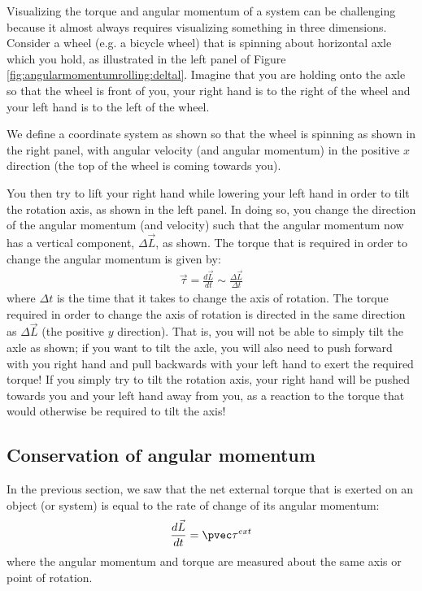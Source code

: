 Visualizing the torque and angular momentum of a system can be challenging because it almost always requires visualizing something in three dimensions. Consider a wheel (e.g. a bicycle wheel) that is spinning about horizontal axle which you hold, as illustrated in the left panel of Figure \ref{fig:angularmomentumrolling:deltal}. Imagine that you are holding onto the axle so that the wheel is front of you, your right hand is to the right of the wheel and your left hand is to the left of the wheel.

We define a coordinate system as shown so that the wheel is spinning as shown in the right panel, with angular velocity (and angular momentum) in the positive $x$ direction (the top of the wheel is coming towards you).

You then try to lift your right hand while lowering your left hand in order to tilt the rotation axis, as shown in the left panel. In doing so, you change the direction of the angular momentum (and velocity) such that the angular momentum now has a vertical component, $\Delta \vec L$, as shown. The torque that is required in order to change the angular momentum is given by:
\begin{align*}
\vec \tau = \frac{d\vec L}{dt} \sim \frac{\Delta \vec L}{\Delta t}
\end{align*}
where $\Delta t$ is the time that it takes to change the axis of rotation. The torque required in order to change the axis of rotation is directed in the same direction as $\Delta \vec L$ (the positive $y$ direction). That is, you will not be able to simply tilt the axle as shown; if you want to tilt the axle, you will also need to push forward with you right hand and pull backwards with your left hand to exert the required torque! If you simply try to tilt the rotation axis, your right hand will be pushed towards you and your left hand away from you, as a reaction to the torque that would otherwise be required to tilt the axis!

\subsection{Conservation of angular momentum}
In the previous section, we saw that the net external torque that is exerted on an object (or system) is equal to the rate of change of its angular momentum:
\begin{align*}
\frac{d\vec L}{dt} = \pvec \tau^{ext}
\end{align*}
where the angular momentum and torque are measured about the same axis or point of rotation.

